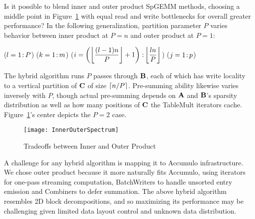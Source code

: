 Is it possible to blend inner and outer product SpGEMM methods,
choosing a middle point in Figure~\ref{fInnerOuterSpectrum}
with equal read and write bottlenecks for overall greater performance?
In the following generalization, 
partition parameter $P$ varies behavior between
inner product at $P=n$ and outer product at $P=1$:

\removelatexerror
\begin{algorithm}[H]
\vspace{\algspace}
\fore($l = 1\colon\! P$){
\fore($k = 1\colon\! m$){
\fore({$i = \left( \floor*{\dfrac{(l-1)n}{P}}+1 \right) \col \floor*{\dfrac{ln}{P}}$}){
\fore($j = 1\colon\! p$){
}}}}
\vspace{\algspace}
\end{algorithm}

The hybrid algorithm runs $P$ passes through $\mathbf{B}$,
each of which has write locality to a vertical partition of $\mathbf{C}$ of size $\lceil n / P\rceil$.
Pre-summing ability likewise varies inversely with $P$, 
though actual pre-summing depends on
$\mathbf{A}$ and $\mathbf{B}$'s  sparsity distribution
as well as how many positions of $\mathbf{C}$ the TableMult iterators cache.
Figure~\ref{fInnerOuterSpectrum}'s center depicts the $P=2$ case.

\begin{figure}[htb]
\centering
\texttt{[image: InnerOuterSpectrum]}
\vspace{-12pt}
\caption{Tradeoffs between Inner and Outer Product}
\label{fInnerOuterSpectrum}
\vspace{-6pt}
\end{figure}


A challenge for any hybrid algorithm is mapping it to Accumulo infrastructure.
We chose outer product because it more naturally fits Accumulo, 
using iterators for one-pass streaming computation, 
BatchWriters to handle unsorted entry emission and Combiners to defer summation.
The above hybrid algorithm resembles 2D block decompositions,
and so maximizing its performance may be challenging 
given limited data layout control and unknown data distribution.


